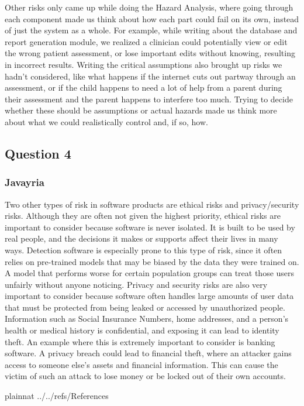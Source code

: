\documentclass{article}
\begin{document}
Other risks only came up while doing the Hazard Analysis, where going through each component
made us think about how each part could fail on its own, instead of just the system as a
whole. For example, while writing about the database and report generation module, 
we realized a clinician could potentially view or edit the wrong patient assessment, or
lose important edits without knowing, resulting in incorrect results. 
Writing the critical assumptions also brought up risks we hadn't considered, like what happens 
if the internet cuts out partway through an assessment, or
if the child happens to need a lot of help from a parent during their assessment and the parent
happens to interfere too much. Trying to decide whether these should be assumptions or actual 
hazards made us think more about what we could realistically control and, if so, how.

\subsection*{Question 4}
\subsubsection*{Javayria}
Two other types of risk in software products are ethical risks and privacy/security risks. Although they are often not given the highest priority, ethical risks are important to consider because software is never isolated. It is built to be used by real people, and the decisions it makes or supports affect their lives in many ways. Detection software is especially prone to this type of risk, since it often relies on pre-trained models that may be biased by the data they were trained on. A model that performs worse for certain population groups can treat those users unfairly without anyone noticing. Privacy and security risks are also very important to consider because software often handles large amounts of user data that must be protected from being leaked or accessed by unauthorized people. Information such as Social Insurance Numbers, home addresses, and a person's health or medical history is confidential, and exposing it can lead to identity theft. An example where this is extremely important to consider is banking software. A privacy breach could lead to financial theft, where an attacker gains access to someone else’s assets and financial information. This can cause the victim of such an attack to lose money or be locked out of their own accounts.

\newpage{}
 {plainnat}
 {../../refs/References}
\newpage{}
\end{document}
